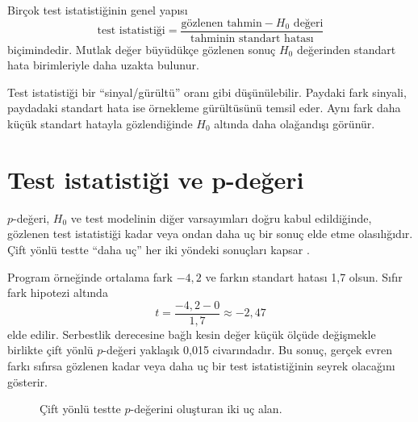 Birçok test istatistiğinin genel yapısı
\[
\text{test istatistiği}
=\frac{\text{gözlenen tahmin}-\text{$H_0$ değeri}}
{\text{tahminin standart hatası}}
\]
biçimindedir. Mutlak değer büyüdükçe gözlenen sonuç $H_0$ değerinden standart
hata birimleriyle daha uzakta bulunur.

\begin{sezgibox}
Test istatistiği bir ``sinyal/gürültü'' oranı gibi düşünülebilir. Paydaki fark
sinyali, paydadaki standart hata ise örnekleme gürültüsünü temsil eder. Aynı
fark daha küçük standart hatayla gözlendiğinde $H_0$ altında daha olağandışı
görünür.
\end{sezgibox}

\section{Test istatistiği ve p-değeri}

$p$-değeri, $H_0$ ve test modelinin diğer varsayımları doğru kabul edildiğinde,
gözlenen test istatistiği kadar veya ondan daha uç bir sonuç elde etme
olasılığıdır. Çift yönlü testte ``daha uç'' her iki yöndeki sonuçları kapsar
\cite{casella2002,wasserman2004}.

Program örneğinde ortalama fark $-4{,}2$ ve farkın standart hatası 1,7 olsun.
Sıfır fark hipotezi altında
\[
t=\frac{-4{,}2-0}{1{,}7}\approx-2{,}47
\]
elde edilir. Serbestlik derecesine bağlı kesin değer küçük ölçüde değişmekle
birlikte çift yönlü $p$-değeri yaklaşık 0,015 civarındadır. Bu sonuç, gerçek
evren farkı sıfırsa gözlenen kadar veya daha uç bir test istatistiğinin seyrek
olacağını gösterir.

\begin{figure}[htbp]
\centering
{}
\caption{Çift yönlü testte $p$-değerini oluşturan iki uç alan.}
\end{figure}

